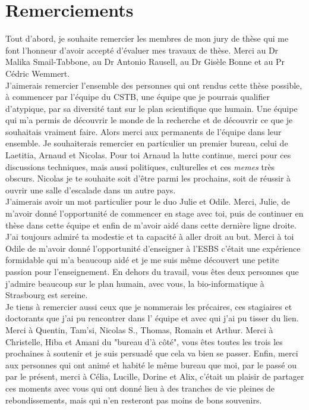 \chapter{Remerciements}
Tout d'abord, je souhaite remercier les membres de mon jury de thèse qui me font l'honneur d'avoir accepté d'évaluer mes travaux de thèse. Merci au Dr Malika Smail-Tabbone, au Dr Antonio Rausell, au Dr Gisèle Bonne et au Pr Cédric Wemmert. \\

J'aimerais remercier l'ensemble des personnes qui ont rendus cette thèse possible, à commencer par l'équipe du CSTB, une équipe que je pourrais qualifier d'atypique, par sa diversité tant sur le plan scientifique que humain. Une équipe qui m'a permis de découvrir le monde de la recherche et de découvrir ce que je souhaitais vraiment faire. Alors merci aux permanents de l'équipe dans leur ensemble. Je souhaiterais remercier en particulier un premier bureau, celui de Laetitia, Arnaud et Nicolas. Pour toi Arnaud la lutte continue, merci pour ces discussions techniques, mais aussi politiques, culturelles et ces \textit{memes} très obscurs. Nicolas je te souhaite soit d'être parmi les prochains, soit de réussir à ouvrir une salle d'escalade dans un autre pays. \\

J'aimerais avoir un mot particulier pour le duo Julie et Odile. Merci, Julie, de m'avoir donné l'opportunité de commencer en stage avec toi, puis de continuer en thèse dans cette équipe et enfin de m'avoir aidé dans cette dernière ligne droite. J'ai toujours admiré ta modestie et ta capacité à aller droit au but. Merci à toi Odile de m'avoir donné l'opportunité d'enseigner à l'ESBS c'était une expérience formidable qui m'a beaucoup aidé et je me suis même découvert une petite passion pour l'enseignement. En dehors du travail, vous êtes deux personnes que j'admire beaucoup sur le plan humain, avec vous, la bio-informatique à Strasbourg est sereine. \\

Je tiens à remercier aussi ceux que je nommerais les précaires, ces stagiaires et doctorants que j'ai pu rencontrer dans l' équipe et avec qui j'ai pu tisser du lien. Merci à Quentin, Tam'si, Nicolas S., Thomas, Romain et Arthur. Merci à Christelle, Hiba et Amani du "bureau d'à côté", vous êtes toutes les trois les prochaines à soutenir et je suis persuadé que cela va bien se passer. Enfin, merci aux personnes qui ont animé et habité le même bureau que moi, par le passé ou par le présent, merci à Célia, Lucille, Dorine et Alix, c'était un plaisir de partager ces moments avec vous qui ont donné lieu à des tranches de vie pleines de rebondissements, mais qui n'en resteront pas moins de bons souvenirs. \\

